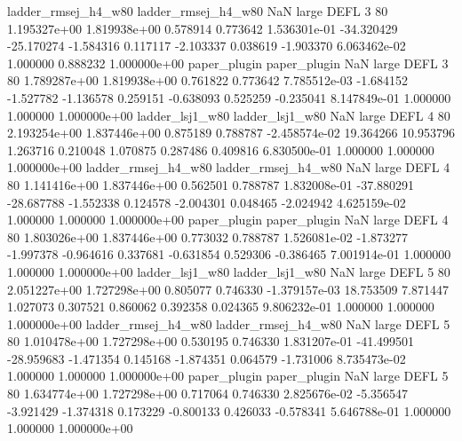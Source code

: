 ladder_rmsej_h4_w80 ladder_rmsej_h4_w80                   NaN      large     DEFL                 3 80 1.195327e+00   1.819938e+00      0.578914       0.773642  1.536301e-01    -34.320429    -25.170274    -1.584316       0.117117 -2.103337   0.038619    -1.903370   6.063462e-02            1.000000        0.888232        1.000000e+00
       paper_plugin        paper_plugin                   NaN      large     DEFL                 3 80 1.789287e+00   1.819938e+00      0.761822       0.773642  7.785512e-03     -1.684152     -1.527782    -1.136578       0.259151 -0.638093   0.525259    -0.235041   8.147849e-01            1.000000        1.000000        1.000000e+00
    ladder_lsj1_w80     ladder_lsj1_w80                   NaN      large     DEFL                 4 80 2.193254e+00   1.837446e+00      0.875189       0.788787 -2.458574e-02     19.364266     10.953796     1.263716       0.210048  1.070875   0.287486     0.409816   6.830500e-01            1.000000        1.000000        1.000000e+00
ladder_rmsej_h4_w80 ladder_rmsej_h4_w80                   NaN      large     DEFL                 4 80 1.141416e+00   1.837446e+00      0.562501       0.788787  1.832008e-01    -37.880291    -28.687788    -1.552338       0.124578 -2.004301   0.048465    -2.024942   4.625159e-02            1.000000        1.000000        1.000000e+00
       paper_plugin        paper_plugin                   NaN      large     DEFL                 4 80 1.803026e+00   1.837446e+00      0.773032       0.788787  1.526081e-02     -1.873277     -1.997378    -0.964616       0.337681 -0.631854   0.529306    -0.386465   7.001914e-01            1.000000        1.000000        1.000000e+00
    ladder_lsj1_w80     ladder_lsj1_w80                   NaN      large     DEFL                 5 80 2.051227e+00   1.727298e+00      0.805077       0.746330 -1.379157e-03     18.753509      7.871447     1.027073       0.307521  0.860062   0.392358     0.024365   9.806232e-01            1.000000        1.000000        1.000000e+00
ladder_rmsej_h4_w80 ladder_rmsej_h4_w80                   NaN      large     DEFL                 5 80 1.010478e+00   1.727298e+00      0.530195       0.746330  1.831207e-01    -41.499501    -28.959683    -1.471354       0.145168 -1.874351   0.064579    -1.731006   8.735473e-02            1.000000        1.000000        1.000000e+00
       paper_plugin        paper_plugin                   NaN      large     DEFL                 5 80 1.634774e+00   1.727298e+00      0.717064       0.746330  2.825676e-02     -5.356547     -3.921429    -1.374318       0.173229 -0.800133   0.426033    -0.578341   5.646788e-01            1.000000        1.000000        1.000000e+00
